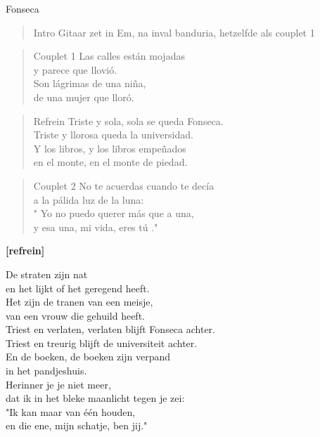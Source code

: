 \begin{song}[vals]{Fonseca}

\begin{verse}{Intro}
Gitaar zet in Em, na inval banduria, hetzelfde als couplet 1
\end{verse}
\begin{verse}{Couplet 1}
Las calles están mojadas\\
y parece que llovió.\\
Son lágrimas de una niña,\\
de una mujer que lloró.\\
\end{verse}

\begin{verse}{Refrein}
Triste y sola, sola se queda Fonseca.\\
Triste y llorosa queda la universidad.\\
Y los libros, y los libros empeñados\\
en el monte, en el monte de piedad.\\
\end{verse}

\begin{verse}{Couplet 2}
No te acuerdas cuando te decía\\
a la pálida luz de la luna:\\
\chord{}" Yo no puedo querer más que a una,\\
y esa una, mi vida, eres tú ."\\
\end{verse}

\textbf{[refrein]}\\
\end{song}
\begin{translation}
De straten zijn nat\\
en het lijkt of het geregend heeft.\\
Het zijn de tranen van een meisje,\\
van een vrouw die gehuild heeft.\\\vspace{1em}
Triest en verlaten, verlaten blijft Fonseca achter.\\
Triest en treurig blijft de universiteit achter.\\
En de boeken, de boeken zijn verpand\\
in het pandjeshuis.\\\vspace{1em}
Herinner je je niet meer,\\
dat ik in het bleke maanlicht tegen je zei:\\
"\hspace{0.1em}Ik kan maar van één houden,\\
en die ene, mijn schatje, ben jij."\\
\end{translation}
